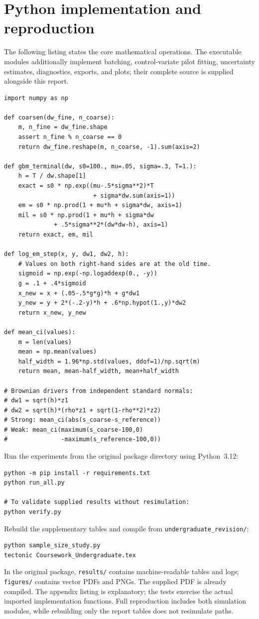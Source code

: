 \documentclass[11pt,a4paper]{article}
\begin{document}
\section{Python implementation and reproduction}
The following listing states the core mathematical operations. The executable
modules additionally implement batching, control-variate pilot fitting, uncertainty estimates, diagnostics, exports, and plots; their complete source is supplied alongside this report.
\begin{lstlisting}[caption={Core SDE updates and coupled error statistics.}]
import numpy as np

def coarsen(dw_fine, n_coarse):
    m, n_fine = dw_fine.shape
    assert n_fine % n_coarse == 0
    return dw_fine.reshape(m, n_coarse, -1).sum(axis=2)

def gbm_terminal(dw, s0=100., mu=.05, sigma=.3, T=1.):
    h = T / dw.shape[1]
    exact = s0 * np.exp((mu-.5*sigma**2)*T
                         + sigma*dw.sum(axis=1))
    em = s0 * np.prod(1 + mu*h + sigma*dw, axis=1)
    mil = s0 * np.prod(1 + mu*h + sigma*dw
              + .5*sigma**2*(dw*dw-h), axis=1)
    return exact, em, mil

def log_em_step(x, y, dw1, dw2, h):
    # Values on both right-hand sides are at the old time.
    sigmoid = np.exp(-np.logaddexp(0., -y))
    g = .1 + .4*sigmoid
    x_new = x + (.05-.5*g*g)*h + g*dw1
    y_new = y + 2*(-.2-y)*h + .6*np.hypot(1.,y)*dw2
    return x_new, y_new

def mean_ci(values):
    m = len(values)
    mean = np.mean(values)
    half_width = 1.96*np.std(values, ddof=1)/np.sqrt(m)
    return mean, mean-half_width, mean+half_width

# Brownian drivers from independent standard normals:
# dw1 = sqrt(h)*z1
# dw2 = sqrt(h)*(rho*z1 + sqrt(1-rho**2)*z2)
# Strong: mean_ci(abs(s_coarse-s_reference))
# Weak: mean_ci(maximum(s_coarse-100,0)
#               -maximum(s_reference-100,0))
\end{lstlisting}
\noindent Run the experiments from the original package directory using Python~3.12:
\begin{lstlisting}[numbers=none]
python -m pip install -r requirements.txt
python run_all.py

# To validate supplied results without resimulation:
python verify.py
\end{lstlisting}
\noindent Rebuild the supplementary tables and compile from \texttt{undergraduate\_revision/}:
\begin{lstlisting}[numbers=none]
python sample_size_study.py
tectonic Coursework_Undergraduate.tex
\end{lstlisting}
\noindent\small In the original package, \texttt{results/} contains machine-readable tables and logs;
\texttt{figures/} contains vector PDFs and PNGs. The supplied PDF is already compiled. The appendix listing is explanatory; the tests exercise the actual imported implementation functions. Full reproduction includes both simulation modules, while rebuilding only the report tables does not resimulate paths.
\end{document}
